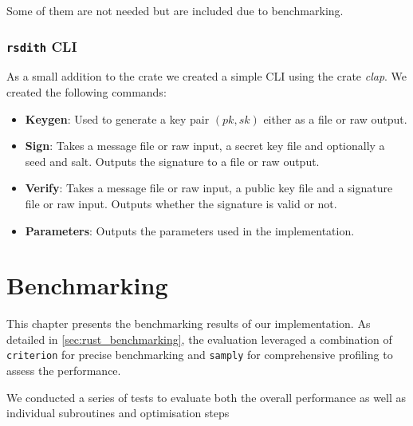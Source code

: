 \documentclass[11pt]{report}
\theoremstyle{definition}
\theoremstyle{plain}
\begin{document}
Some of them are not needed but are included due to benchmarking.

\subsection{\texttt{rsdith} CLI}
As a small addition to the crate we created a simple CLI using the crate \textit{clap}. We created the following commands:
\begin{itemize}
  \item \textbf{Keygen}: Used to generate a key pair $(pk,sk)$ either as a file or raw output.
  \item \textbf{Sign}: Takes a message file or raw input, a secret key file and optionally a seed and salt. Outputs the signature to a file or raw output.
  \item \textbf{Verify}: Takes a message file or raw input, a public key file and a signature file or raw input. Outputs whether the signature is valid or not.
  \item \textbf{Parameters}: Outputs the parameters used in the implementation.
\end{itemize}

\chapter{Benchmarking}\label{ch:bench}

This chapter presents the benchmarking results of our implementation. As detailed in \autoref{sec:rust_benchmarking}, the evaluation leveraged a combination of \texttt{criterion} for precise benchmarking and \texttt{samply} for comprehensive profiling to assess the performance.

We conducted a series of tests to evaluate both the overall performance as well as individual subroutines and optimisation steps
\end{document}
